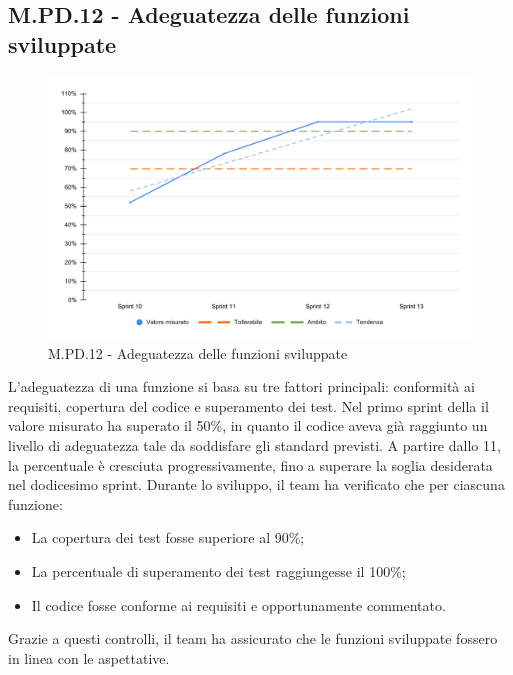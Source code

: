 \subsection{M.PD.12 - Adeguatezza delle funzioni sviluppate}

\begin{figure}[H]
  \centering
  \includegraphics[width=\textwidth]{assets/adeguatezza_funzioni.pdf}
  \caption{M.PD.12 - Adeguatezza delle funzioni sviluppate}
\end{figure}

\par L'adeguatezza di una funzione si basa su tre fattori principali: conformità ai requisiti, copertura del codice e superamento dei test. Nel primo sprint della  il valore misurato ha superato il 50\%, in quanto il codice  aveva già raggiunto un livello di adeguatezza tale da soddisfare gli standard previsti. A partire dallo  11, la percentuale è cresciuta progressivamente, fino a superare la soglia desiderata nel dodicesimo sprint. Durante lo sviluppo, il team ha verificato che per ciascuna funzione:
\begin{itemize}
  \item La copertura dei test fosse superiore al 90\%;
  \item La percentuale di superamento dei test raggiungesse il 100\%;
  \item Il codice fosse conforme ai requisiti e opportunamente commentato.
\end{itemize}

\vspace{0.5\baselineskip}
\par Grazie a questi controlli, il team ha assicurato che le funzioni sviluppate fossero in linea con le aspettative.